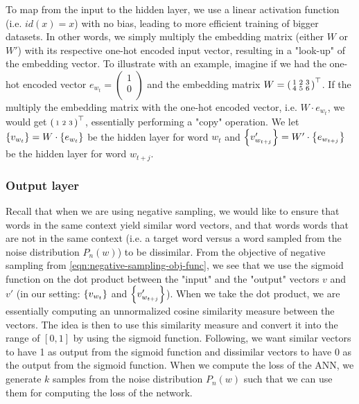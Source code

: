 To map from the input to the hidden layer, we use a linear activation function (i.e. $id(x) = x$) with no bias, leading to more efficient training of bigger datasets. In other words, we simply multiply the embedding matrix (either $W$ or $W'$) with its respective one-hot encoded input vector, resulting in a "look-up" of the embedding vector. To illustrate with an example, imagine if we had the one-hot encoded vector $e_{w_t} = \left( \begin{smallmatrix}
    1\\
    0\\
\end{smallmatrix} \right)$ and the embedding matrix $W = {\left( \begin{smallmatrix}
    1 & 2 & 3\\
    4 & 5 & 6\\
\end{smallmatrix} \right)}^\top$. If the multiply the embedding matrix with the one-hot encoded vector, i.e. $W \cdot e_{w_t}$, we would get ${\left( \begin{smallmatrix}
    1 & 2 & 3\\
\end{smallmatrix} \right)}^\top$, essentially performing a "copy" operation. We let $\left\{v_{w_t}\right\} = W \cdot \left\{e_{w_t}\right\}$ be the hidden layer for word $w_t$ and $\left\{v'_{w_{t+j}}\right\} = W' \cdot \left\{e_{w_{t+j}}\right\}$ be the hidden layer for word $w_{t+j}$. 

\subsubsection{Output layer}
Recall that when we are using negative sampling, we would like to ensure that words in the same context yield similar word vectors, and that words words that are not in the same context (i.e. a target word versus a word sampled from the noise distribution $P_n(w)$) to be dissimilar. From the objective of negative sampling from \cref{eqn:negative-sampling-obj-func}, we see that we use the sigmoid function on the dot product between the "input" and the "output" vectors $v$ and $v'$ (in our setting: $\left\{v_{w_t}\right\}$ and $\left\{v'_{w_{t+j}}\right\}$). When we take the dot product, we are essentially computing an unnormalized cosine similarity measure between the vectors. The idea is then to use this similarity measure and convert it into the range of $[0, 1]$ by using the sigmoid function. Following, we want similar vectors to have 1 as output from the sigmoid function and dissimilar vectors to have 0 as the output from the sigmoid function. When we compute the loss of the ANN, we generate $k$ samples from the noise distribution $P_n(w)$ such that we can use them for computing the loss of the network.

